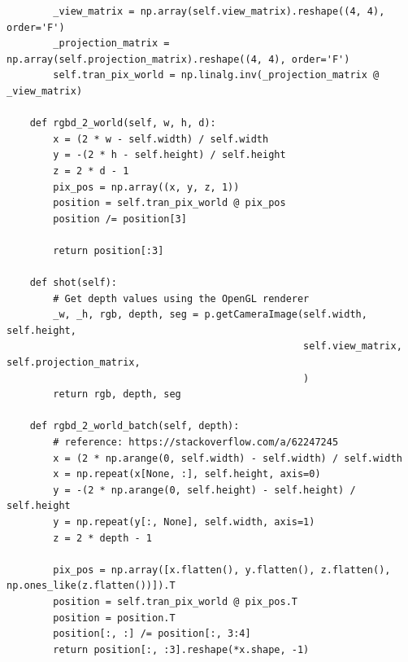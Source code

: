 \documentclass[11pt, a4paper]{report}
\begin{document}
\begin{lstlisting}
        _view_matrix = np.array(self.view_matrix).reshape((4, 4), order='F')
        _projection_matrix = np.array(self.projection_matrix).reshape((4, 4), order='F')
        self.tran_pix_world = np.linalg.inv(_projection_matrix @ _view_matrix)

    def rgbd_2_world(self, w, h, d):
        x = (2 * w - self.width) / self.width
        y = -(2 * h - self.height) / self.height
        z = 2 * d - 1
        pix_pos = np.array((x, y, z, 1))
        position = self.tran_pix_world @ pix_pos
        position /= position[3]

        return position[:3]

    def shot(self):
        # Get depth values using the OpenGL renderer
        _w, _h, rgb, depth, seg = p.getCameraImage(self.width, self.height,
                                                   self.view_matrix, self.projection_matrix,
                                                   )
        return rgb, depth, seg

    def rgbd_2_world_batch(self, depth):
        # reference: https://stackoverflow.com/a/62247245
        x = (2 * np.arange(0, self.width) - self.width) / self.width
        x = np.repeat(x[None, :], self.height, axis=0)
        y = -(2 * np.arange(0, self.height) - self.height) / self.height
        y = np.repeat(y[:, None], self.width, axis=1)
        z = 2 * depth - 1

        pix_pos = np.array([x.flatten(), y.flatten(), z.flatten(), np.ones_like(z.flatten())]).T
        position = self.tran_pix_world @ pix_pos.T
        position = position.T
        position[:, :] /= position[:, 3:4]
        return position[:, :3].reshape(*x.shape, -1)

\end{lstlisting}
\end{document}
